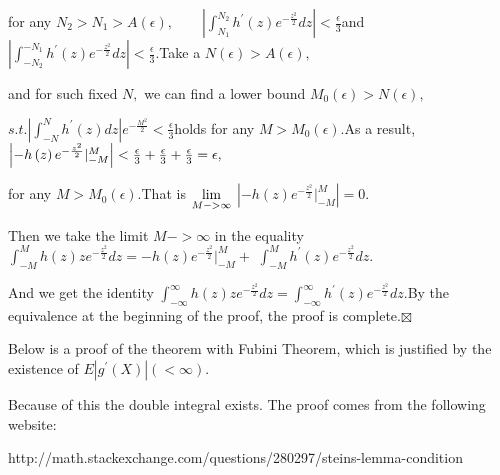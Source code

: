 \documentclass{article}
\begin{document}
for any $N_{2}>N_{1}>A\left( \epsilon \right) ,\qquad \left\vert
\int_{N_{1}}^{N_{2}}h^{\prime }\left( z\right) e^{-\frac{z^{2}}{2}%
}dz\right\vert <\frac{\epsilon }{3}$and $\left\vert
\int_{-N_{2}}^{-N_{1}}h^{\prime }\left( z\right) e^{-\frac{z^{2}}{2}%
}dz\right\vert <\frac{\epsilon }{3}.$Take a $N\left( \epsilon \right)
>A\left( \epsilon \right) ,$

and for such fixed $N,$ we can find a lower bound $M_{0}\left( \epsilon
\right) >N\left( \epsilon \right) ,$

$s.t.\left\vert \int_{-N}^{N}h^{\prime }\left( z\right) dz\right\vert e^{-%
\frac{M^{2}}{2}}<\frac{\epsilon }{3}$holds for any $M>M_{0}\left( \epsilon
\right) .$As a result, $\left\vert -h\left( z\right) e^{-\frac{z^{2}}{2}%
}|_{-M}^{M}\right\vert <\frac{\epsilon }{3}+\frac{\epsilon }{3}+\frac{%
\epsilon }{3}=\epsilon ,$

for any $M>M_{0}\left( \epsilon \right) .$That is $\underset{M->\infty }{%
\lim }$ $\left\vert -h\left( z\right) e^{-\frac{z^{2}}{2}}|_{-M}^{M}\right%
\vert =0.$

Then we take the limit  $M->\infty $ in the equality $\int_{-M}^{M}h\left(
z\right) ze^{-\frac{z^{2}}{2}}dz=-h\left( z\right) e^{-\frac{z^{2}}{2}%
}|_{-M}^{M}+$ $\int_{-M}^{M}h^{\prime }\left( z\right) e^{-\frac{z^{2}}{2}%
}dz.$

And we get the identity  $\int_{-\infty }^{\infty }h\left( z\right) ze^{-%
\frac{z^{2}}{2}}dz=\int_{-\infty }^{\infty }h^{\prime }\left( z\right) e^{-%
\frac{z^{2}}{2}}dz.$By the equivalence at the beginning of the proof, the
proof is complete.$\boxtimes $

Below is a proof of the theorem with Fubini Theorem, which is justified by
the existence of $E\left\vert g^{\prime }\left( X\right) \right\vert \left(
<\infty \right) .$

Because of this the double integral exists. The proof comes from the
following website:

http://math.stackexchange.com/questions/280297/steins-lemma-condition\qquad
\qquad \qquad\ \ \ \ 


\end{document}
